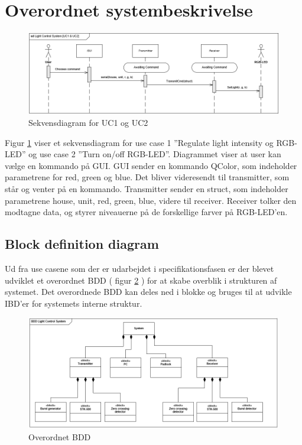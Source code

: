 \documentclass[oneside]{memoir}
\begin{document}
		\section{Overordnet systembeskrivelse}	
\begin{figure}[H]
\centering
\includegraphics[width=0.9\linewidth]{"billeder til latex/UC1og2"}
\caption{Sekvensdiagram for UC1 og UC2}
\label{fig:UC1og2}
\end{figure}
	
	Figur \ref{fig:UC1og2} viser et sekvensdiagram for use case 1 ”Regulate light intensity og RGB-LED” og use case 2 ”Turn on/off RGB-LED”. Diagrammet viser at user kan vælge en kommando på GUI. GUI sender en kommando QColor, som indeholder parametrene for red, green og blue. Det bliver videresendt til transmitter, som står og venter på en kommando. Transmitter sender en struct, som indeholder parametrene house, unit, red, green, blue, videre til receiver. Receiver tolker den modtagne data, og styrer niveauerne på de forskellige farver på RGB-LED’en. 
\newpage
		\subsection{Block definition diagram}
		Ud fra use casene som der er udarbejdet i specifikationsfasen er der blevet udviklet et overordnet BDD ( figur \ref{fig:BDDoverordnet} ) for at skabe overblik i strukturen af systemet. Det overordnede BDD kan deles ned i blokke og bruges til at udvikle IBD'er for systemets interne struktur. 
		
\begin{figure}[H]
\centering
\includegraphics[width=1\linewidth]{"billeder til latex/BDDoverordnet"}
\caption{ Overordnet BDD }
\label{fig:BDDoverordnet}
\end{figure}
		\newpage
\end{document}
